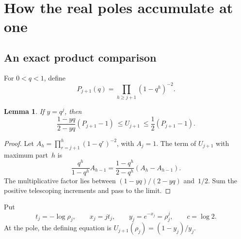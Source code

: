 \documentclass[11pt,a4paper]{article}
\numberwithin{equation}{section}
\newtheorem{lemma}[theorem]{Lemma}
\theoremstyle{definition}\newtheorem{definition}[theorem]{Definition}
\theoremstyle{remark}\newtheorem{remark}[theorem]{Remark}
\begin{document}
\section{How the real poles accumulate at one}\label{vmb:sec:accumulation}

\subsection{An exact product comparison}
For \(0<q<1\), define
\begin{equation}
P_{j+1}(q)=\prod_{h\geq j+1}(1-q^h)^{-2}.
\end{equation}
\begin{lemma}\label{vmb:lem:productcomparison}
If \(y=q^j\), then
\begin{equation}\label{vmb:eq:Pcomparison}
\frac{1-yq}{2-yq}(P_{j+1}-1)
\ \leq U_{j+1}\ \leq\frac12(P_{j+1}-1).
\end{equation}
\end{lemma}
\begin{proof}
Let \(A_h=\prod_{r=j+1}^h(1-q^r)^{-2}\), with \(A_j=1\).
The term of \(U_{j+1}\) with maximum part~\(h\) is
\[
\frac{q^h}{1-q^h}A_{h-1}
=\frac{1-q^h}{2-q^h}(A_h-A_{h-1}).
\]
The multiplicative factor lies between
\((1-yq)/(2-yq)\) and~\(1/2\). Sum the positive telescoping
increments and pass to the limit.
\end{proof}

Put
\begin{equation}\label{vmb:eq:xt}
t_j=-\log\rho_j,\qquad x_j=jt_j,\qquad y_j=e^{-x_j}=\rho_j^j,
\qquad c=\log2.
\end{equation}
At the pole, the defining equation is
\(U_{j+1}(\rho_j)=(1-y_j)/y_j\).
\end{document}

